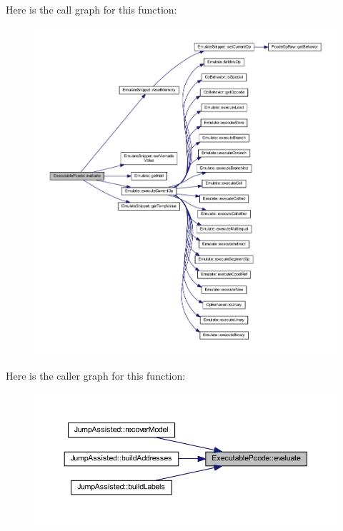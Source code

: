 Here is the call graph for this function\+:
\nopagebreak
\begin{figure}[H]
\begin{center}
\leavevmode
\includegraphics[width=350pt]{class_executable_pcode_a0ff39a9bb778d67df86b741a20739d75_cgraph}
\end{center}
\end{figure}
Here is the caller graph for this function\+:
\nopagebreak
\begin{figure}[H]
\begin{center}
\leavevmode
\includegraphics[width=350pt]{class_executable_pcode_a0ff39a9bb778d67df86b741a20739d75_icgraph}
\end{center}
\end{figure}
\mbox{\label{class_executable_pcode_a778beba39ea7ee969febbfce992d6600}} 
